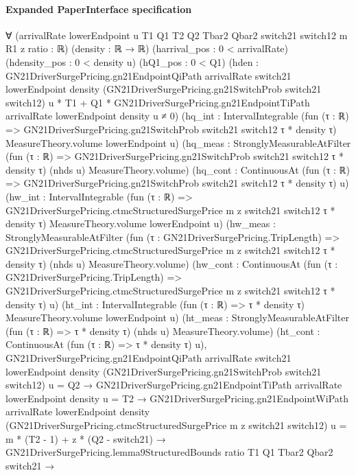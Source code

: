\documentclass[10pt]{article}
\begin{document}
\paragraph{Expanded PaperInterface specification}
\begin{ReviewVerbatim}
∀ (arrivalRate lowerEndpoint u T1 Q1 T2 Q2 Tbar2 Qbar2 switch21 switch12 m R1 z ratio : ℝ) (density : ℝ → ℝ)
  (harrival_pos : 0 < arrivalRate) (hdensity_pos : 0 < density u) (hQ1_pos : 0 < Q1)
  (hden :
    GN21DriverSurgePricing.gn21EndpointQiPath arrivalRate switch21 lowerEndpoint density
            (GN21DriverSurgePricing.gn21SwitchProb switch21 switch12) u *
          T1 +
        Q1 * GN21DriverSurgePricing.gn21EndpointTiPath arrivalRate lowerEndpoint density u ≠
      0)
  (hq_int :
    IntervalIntegrable (fun (τ : ℝ) => GN21DriverSurgePricing.gn21SwitchProb switch21 switch12 τ * density τ)
      MeasureTheory.volume lowerEndpoint u)
  (hq_meas :
    StronglyMeasurableAtFilter (fun (τ : ℝ) => GN21DriverSurgePricing.gn21SwitchProb switch21 switch12 τ * density τ)
      (nhds u) MeasureTheory.volume)
  (hq_cont : ContinuousAt (fun (τ : ℝ) => GN21DriverSurgePricing.gn21SwitchProb switch21 switch12 τ * density τ) u)
  (hw_int :
    IntervalIntegrable
      (fun (τ : ℝ) => GN21DriverSurgePricing.ctmcStructuredSurgePrice m z switch21 switch12 τ * density τ)
      MeasureTheory.volume lowerEndpoint u)
  (hw_meas :
    StronglyMeasurableAtFilter
      (fun (τ : GN21DriverSurgePricing.TripLength) =>
        GN21DriverSurgePricing.ctmcStructuredSurgePrice m z switch21 switch12 τ * density τ)
      (nhds u) MeasureTheory.volume)
  (hw_cont :
    ContinuousAt
      (fun (τ : GN21DriverSurgePricing.TripLength) =>
        GN21DriverSurgePricing.ctmcStructuredSurgePrice m z switch21 switch12 τ * density τ)
      u)
  (ht_int : IntervalIntegrable (fun (τ : ℝ) => τ * density τ) MeasureTheory.volume lowerEndpoint u)
  (ht_meas : StronglyMeasurableAtFilter (fun (τ : ℝ) => τ * density τ) (nhds u) MeasureTheory.volume)
  (ht_cont : ContinuousAt (fun (τ : ℝ) => τ * density τ) u),
  GN21DriverSurgePricing.gn21EndpointQiPath arrivalRate switch21 lowerEndpoint density
        (GN21DriverSurgePricing.gn21SwitchProb switch21 switch12) u =
      Q2 →
    GN21DriverSurgePricing.gn21EndpointTiPath arrivalRate lowerEndpoint density u = T2 →
      GN21DriverSurgePricing.gn21EndpointWiPath arrivalRate lowerEndpoint density
            (GN21DriverSurgePricing.ctmcStructuredSurgePrice m z switch21 switch12) u =
          m * (T2 - 1) + z * (Q2 - switch21) →
        GN21DriverSurgePricing.lemma9StructuredBounds ratio T1 Q1 Tbar2 Qbar2 switch21 →

\end{ReviewVerbatim}
\end{document}

